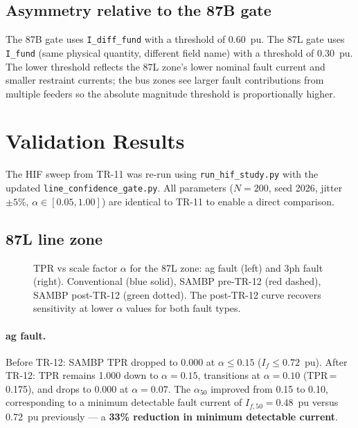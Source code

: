 \documentclass[11pt,a4paper]{article}
\newcommand{\alphafifty}{\alpha_{50}}
\begin{document}
\subsection{Asymmetry relative to the 87B gate}

The 87B gate uses \texttt{I\_diff\_fund} with a threshold of 0.60~pu.  The
87L gate uses \texttt{I\_fund} (same physical quantity, different field name)
with a threshold of 0.30~pu.  The lower threshold reflects the 87L zone's
lower nominal fault current and smaller restraint currents; the bus zones see
larger fault contributions from multiple feeders so the absolute magnitude
threshold is proportionally higher.

\section{Validation Results}
\label{sec:results}

The HIF sweep from TR-11 was re-run using \texttt{run\_hif\_study.py}
with the updated \texttt{line\_confidence\_gate.py}.  All parameters
($N = 200$, seed 2026, jitter $\pm5\%$, $\alpha \in [0.05, 1.00]$) are
identical to TR-11 to enable a direct comparison.

\subsection{87L line zone}

\begin{figure}[h]
  \centering
  
  \caption{TPR vs scale factor $\alpha$ for the 87L zone: ag fault (left)
           and 3ph fault (right).  Conventional (blue solid), SAMBP pre-TR-12
           (red dashed), SAMBP post-TR-12 (green dotted).
           The post-TR-12 curve recovers sensitivity at lower $\alpha$ values
           for both fault types.}
  \label{fig:87l_comparison}
\end{figure}

\paragraph{ag fault.}
Before TR-12: SAMBP TPR dropped to 0.000 at $\alpha \leq 0.15$
($I_f \leq 0.72$~pu).  After TR-12: TPR remains 1.000 down to $\alpha = 0.15$,
transitions at $\alpha = 0.10$ (TPR\,=\,0.175), and drops to 0.000 at
$\alpha = 0.07$.  The $\alphafifty$ improved from 0.15 to 0.10, corresponding
to a minimum detectable fault current of $I_{f,50} = 0.48$~pu versus
0.72~pu previously — a \textbf{33\% reduction in minimum detectable current}.
\end{document}
